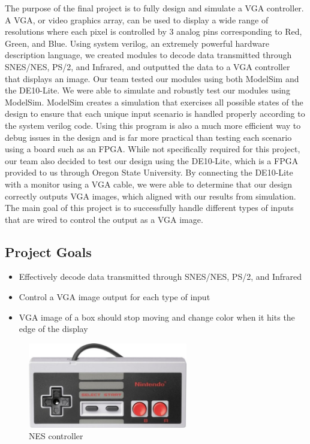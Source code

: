 \documentclass[12pt]{article}
\numberwithin{figure}{subsection}
\begin{document}
The purpose of the final project is to fully design and simulate a VGA controller. A VGA, or video graphics array, can be used to display a wide range of resolutions where each pixel is controlled by 3 analog pins corresponding to Red, Green, and Blue. Using system verilog, an extremely powerful hardware description language, we created modules to decode data transmitted through SNES/NES, PS/2, and Infrared, and outputted the data to a VGA controller that displays an image. Our team tested our modules using both ModelSim and the DE10-Lite. We were able to simulate and robustly test our modules using ModelSim. ModelSim creates a simulation that exercises all possible states of the design to ensure that each unique input scenario is handled properly according to the system verilog code. Using this program is also a much more efficient way to debug issues in the design and is far more practical than testing each scenario using a board such as an FPGA. While not specifically required for this project, our team also decided to test our design using the DE10-Lite, which is a FPGA provided to us through Oregon State University. By connecting the DE10-Lite with a monitor using a VGA cable, we were able to determine that our design correctly outputs VGA images, which aligned with our results from simulation. The main goal of this project is to successfully handle different types of inputs that are wired to control the output as a VGA image.

\subsection{Project Goals}

\begin{itemize}
  \item Effectively decode data transmitted through SNES/NES, PS/2, and Infrared
  \item Control a VGA image output for each type of input
  \item VGA image of a box should stop moving and change color when it hits the edge of the display
\end{itemize}

\begin{figure}[ht]
  \centering
  \includegraphics[width=0.62\textwidth]{nes_controller.jpg}
  \caption{NES controller}
  \label{fig:nes_controller}
\end{figure}
\end{document}
